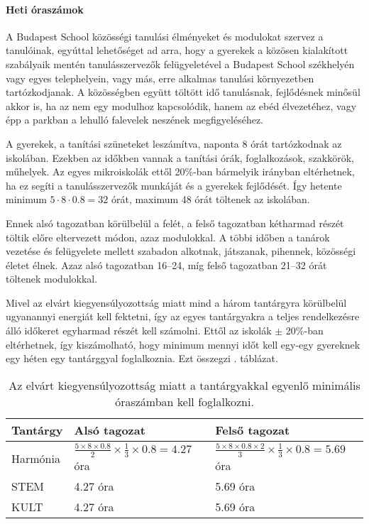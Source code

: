 \paragraph{Heti óraszámok}

A Budapest School közösségi tanulási élményeket és modulokat szervez a tanulóinak, egyúttal lehetőséget ad arra, hogy a gyerekek a közösen kialakított szabályaik mentén tanulásszervezők felügyeletével a Budapest School székhelyén vagy egyes telephelyein, vagy más, erre alkalmas tanulási környezetben tartózkodjanak. A közösségben együtt töltött idő tanulásnak, fejlődésnek minősül akkor is, ha az nem egy modulhoz kapcsolódik, hanem az ebéd élvezetéhez, vagy épp a parkban a lehulló falevelek neszének megfigyeléséhez.

A gyerekek, a tanítási szüneteket leszámítva, naponta 8 órát tartózkodnak az iskolában. Ezekben az időkben vannak a tanítási órák, foglalkozások, szakkörök, műhelyek. Az egyes mikroiskolák ettől 20\%-ban bármelyik irányban eltérhetnek, ha ez segíti a tanulásszervezők munkáját és a gyerekek fejlődését. Így hetente minimum $5 \cdot 8 \cdot 0.8 = 32$ órát, maximum 48 órát töltenek az iskolában.

Ennek alsó tagozatban körülbelül a felét, a felső tagozatban kétharmad részét töltik előre eltervezett módon, azaz modulokkal. A többi időben a tanárok vezetése és felügyelete mellett szabadon alkotnak, játszanak, pihennek, közösségi életet élnek. Azaz alsó tagozatban 16--24, míg felső tagozatban 21--32 órát töltenek modulokkal.

Mivel az elvárt kiegyensúlyozottság miatt mind a három tantárgyra körülbelül ugyanannyi energiát kell fektetni, így az egyes tantárgyakra a teljes rendelkezésre álló időkeret egyharmad részét kell számolni. Ettől az iskolák $\pm$ 20\%-ban eltérhetnek, így kiszámolható, hogy minimum mennyi időt kell egy-egy gyereknek egy héten egy tantárggyal foglalkoznia. Ezt összegzi . táblázat.


			\begin{table}

				\begin{tabular}{ l|l|l }

					\textbf{Tantárgy} & \textbf{Alsó tagozat} & \textbf{Felső tagozat}\\ \hline
Harmónia & $\frac{5 \times 8 \times 0.8}{2} \times \frac{1}{3} \times 0.8 = 4.27$ óra &
$\frac{5 \times 8 \times 0.8 \times 2}{3} \times \frac{1}{3} \times 0.8 = 5.69$   óra\\ \hline
STEM & 4.27 óra &  5.69 óra\\ \hline
KULT  & 4.27 óra & 5.69 óra\\ \hline

				\end{tabular}
        \caption{Az elvárt kiegyensúlyozottság miatt a tantárgyakkal egyenlő minimális óraszámban kell foglalkozni.}
        \label{tbl:oraszamok}
			\end{table}

